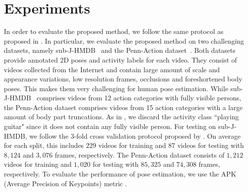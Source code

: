 \documentclass[a4paper, 10pt, conference]{ieeeconf}      \usepackage{FG2017}
\begin{document}
\section{Experiments}
\label{sec:experiments}
In order to evaluate the proposed method, we follow the same protocol as proposed in \cite{bruce_cvpr2015}. In particular, we evaluate the proposed method on two challenging datasets, namely \mbox{sub-J-HMDB}~\cite{Jhuang_iccv2013}
and the Penn-Action dataset~\cite{zhang2013actemes}. Both datasets provide annotated 2D poses and activity labels for each video. They consist of videos collected from the Internet and contain large amount of scale and appearance variations, low resolution frames, occlusions and foreshortened body poses. This makes them very challenging for human pose estimation. 
While sub-J-HMDB~\cite{Jhuang_iccv2013} comprises videos from 12 action categories with fully visible persons, the Penn-Action dataset comprises videos from 15 action categories with a large amount of body part truncations. As in \cite{bruce_cvpr2015}, we discard the activity class ``playing guitar" since it does not contain any fully visible person. 
For testing on sub-J-HMDB, we follow the 3-fold cross validation protocol proposed by \cite{Jhuang_iccv2013}. On average for each split, this includes $229$ videos for training and $87$ videos for testing with $8,124$ and $3,076$ frames, respectively. 
The Penn-Action dataset consists of $1,212$ videos for training and $1,020$ for testing with $85,325$ and $74,308$ frames, respectively. 
To evaluate the performance of pose estimation, we use the APK (Average Precision of Keypoints) metric \cite{yang_tpami2014,bruce_cvpr2015}. 


\begin{table}[htbp]
  \centering
  \footnotesize
\def\arraystretch{1}

  \caption{Comparison of the features used in \cite{dantone_tpami2014} with the proposed convolutional channel features (CCF).   APK with threshold 0.1 on split-1 of sub-J-HMDB.}
  \label{tab:mcf_vs_ccf}
\end{table}
\end{document}

